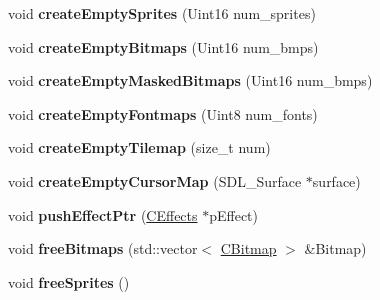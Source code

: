 \begin{DoxyCompactItemize}
\item 
\hypertarget{class_c_gfx_engine_a82cb8ea694ade8075d62bad3194dd8ef}{
void {\bfseries createEmptySprites} (Uint16 num\_\-sprites)}
\label{class_c_gfx_engine_a82cb8ea694ade8075d62bad3194dd8ef}

\item 
\hypertarget{class_c_gfx_engine_a0433792435cf1db077c3a65f3c94a13f}{
void {\bfseries createEmptyBitmaps} (Uint16 num\_\-bmps)}
\label{class_c_gfx_engine_a0433792435cf1db077c3a65f3c94a13f}

\item 
\hypertarget{class_c_gfx_engine_a0a1f98e03caffe65a5b8f6fe5616b786}{
void {\bfseries createEmptyMaskedBitmaps} (Uint16 num\_\-bmps)}
\label{class_c_gfx_engine_a0a1f98e03caffe65a5b8f6fe5616b786}

\item 
\hypertarget{class_c_gfx_engine_a6e21c0e1142e65c59a48a9ac03b5e256}{
void {\bfseries createEmptyFontmaps} (Uint8 num\_\-fonts)}
\label{class_c_gfx_engine_a6e21c0e1142e65c59a48a9ac03b5e256}

\item 
\hypertarget{class_c_gfx_engine_a00d146cc58388217173de06f26f6824d}{
void {\bfseries createEmptyTilemap} (size\_\-t num)}
\label{class_c_gfx_engine_a00d146cc58388217173de06f26f6824d}

\item 
\hypertarget{class_c_gfx_engine_a3b7f7a2ec2e3a26f71c755f99ad6664e}{
void {\bfseries createEmptyCursorMap} (SDL\_\-Surface $\ast$surface)}
\label{class_c_gfx_engine_a3b7f7a2ec2e3a26f71c755f99ad6664e}

\item 
\hypertarget{class_c_gfx_engine_a56ee497d63db8c860695202ba0441415}{
void {\bfseries pushEffectPtr} (\hyperlink{class_c_effects}{CEffects} $\ast$pEffect)}
\label{class_c_gfx_engine_a56ee497d63db8c860695202ba0441415}

\item 
\hypertarget{class_c_gfx_engine_a0e7d1e27c94788edbab856def46e4d4e}{
void {\bfseries freeBitmaps} (std::vector$<$ \hyperlink{class_c_bitmap}{CBitmap} $>$ \&Bitmap)}
\label{class_c_gfx_engine_a0e7d1e27c94788edbab856def46e4d4e}

\item 
\hypertarget{class_c_gfx_engine_a5163091bcbae991556ecddb10f270666}{
void {\bfseries freeSprites} ()}
\label{class_c_gfx_engine_a5163091bcbae991556ecddb10f270666}


\end{DoxyCompactItemize}
